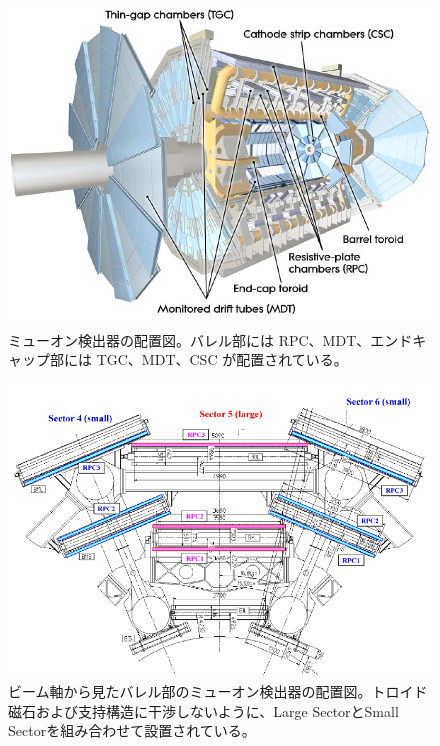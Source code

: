 \begin{figure}[tb]
  \centering
  \includegraphics[clip, width=12cm]{fig/2/muondetector.pdf}
  \caption{ミューオン検出器の配置図\cite{Aad:1129811}。バレル部には RPC、MDT、エンドキャップ部には TGC、MDT、CSC が配置されている。}
  \label{fig:ミューオン検出器}
\end{figure}

\begin{figure}[tb]
  \centering
  \includegraphics[clip, width=12cm]{fig/2/RPC_xy.pdf}
  \caption{ビーム軸から見たバレル部のミューオン検出器の配置図\cite{Aad:1129811}。トロイド磁石および支持構造に干渉しないように、Large SectorとSmall Sectorを組み合わせて設置されている。}
  \label{fig:ミューオン検出器_バレル部}
\end{figure}

